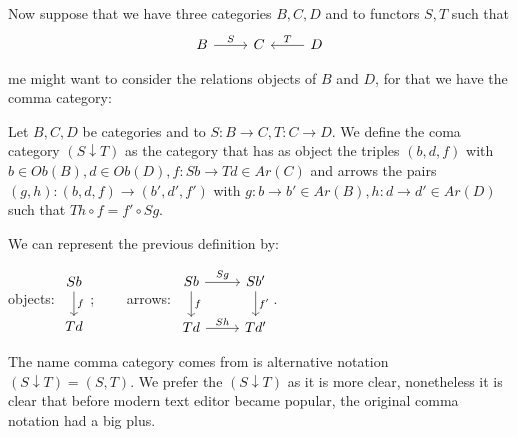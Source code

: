 Now suppose that we have three categories $B,C,D$ and to functors $S,T$ such that
\[
  \begin{tikzcd}
    B \ar[r, "S"] & C & D\ar[l, "T", swap]
  \end{tikzcd}
    \]

    me might want to consider the relations objects of $B$ and $D$, for that we have the comma category:
    

\begin{definition}
  Let $B,C,D$ be categories and to $S:B\to C,T: C\to D$. We define the coma category $(S\downarrow T)$ as the category that has as object the triples $(b,d,f)$ with $b\in Ob(B), d\in Ob(D), f:Sb\to Td\in Ar(C)$ and arrows the pairs $(g,h):(b,d,f)\to (b',d',f')$ with $g:b\to b'\in Ar(B), h:d\to d'\in Ar(D)$ such that $Th \circ f = f' \circ Sg$. 
\end{definition}

We can represent the previous definition by:
\begin{center}
objects: $
\begin{tikzcd}
      Sb\ar[d,"f"]
      \\
      Td
    \end{tikzcd}
$;$\qquad$ arrows: $\begin{tikzcd}
      Sb\ar[d,"f"]\ar[r,"Sg"] & Sb' \ar[d,"f'"]
      \\
      Td\ar[r,"Sh"] & Td'
  \end{tikzcd}$.
\end{center}


The name comma category comes from is alternative notation $(S\downarrow T) = (S,T)$. We prefer the $(S\downarrow T)$ as it is more clear, nonetheless it is clear that before modern text editor became popular, the original comma notation had a big plus. 